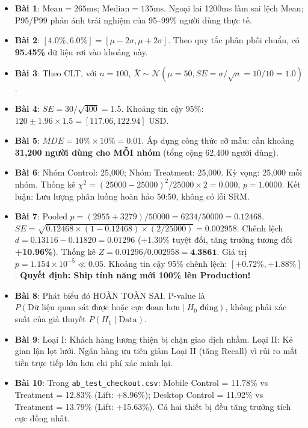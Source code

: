 \begin{dapanbox}
\begin{itemize}
    \item \textbf{Bài 1}: $\text{Mean} = 265$ms; $\text{Median} = 135$ms. Ngoại lai 1200ms làm sai lệch Mean; P95/P99 phản ánh trải nghiệm của 95--99\% người dùng thực tế.
    \item \textbf{Bài 2}: $[4.0\%, 6.0\%] = [\mu - 2\sigma, \mu + 2\sigma]$. Theo quy tắc phân phối chuẩn, có \textbf{95.45\%} dữ liệu rơi vào khoảng này.
    \item \textbf{Bài 3}: Theo CLT, với $n = 100$, $\bar{X} \sim \mathcal{N}(\mu = 50, SE = \sigma/\sqrt{n} = 10/10 = 1.0)$.
    \item \textbf{Bài 4}: $SE = 30 / \sqrt{400} = 1.5$. Khoảng tin cậy 95\%: $120 \pm 1.96 \times 1.5 = [117.06, 122.94]$ USD.
    \item \textbf{Bài 5}: $MDE = 10\% \times 10\% = 0.01$. Áp dụng công thức cỡ mẫu: cần khoảng \textbf{31,200 người dùng cho MỖI nhóm} (tổng cộng 62,400 người dùng).
    \item \textbf{Bài 6}: Nhóm Control: 25,000; Nhóm Treatment: 25,000. Kỳ vọng: 25,000 mỗi nhóm. Thống kê $\chi^2 = (25000-25000)^2/25000 \times 2 = 0.000$, $p = 1.0000$. Kết luận: Lưu lượng phân luồng hoàn hảo 50:50, không có lỗi SRM.
    \item \textbf{Bài 7}: Pooled $p = (2955 + 3279) / 50000 = 6234 / 50000 = 0.12468$. $SE = \sqrt{0.12468 \times (1 - 0.12468) \times (2 / 25000)} = 0.002958$. Chênh lệch $d = 0.13116 - 0.11820 = 0.01296$ (+1.30\% tuyệt đối, tăng trưởng tương đối \textbf{+10.96\%}). Thống kê $Z = 0.01296 / 0.002958 = \textbf{4.3861}$. Giá trị $p = 1.154 \times 10^{-5} \ll 0.05$. Khoảng tin cậy 95\% chênh lệch: $[+0.72\%, +1.88\%]$. \textbf{Quyết định: Ship tính năng mới 100\% lên Production!}
    \item \textbf{Bài 8}: Phát biểu đó HOÀN TOÀN SAI. P-value là $P(\text{Dữ liệu quan sát được hoặc cực đoan hơn} \mid H_0 \text{ đúng})$, không phải xác suất của giả thuyết $P(H_1 \mid \text{Data})$.
    \item \textbf{Bài 9}: Loại I: Khách hàng lương thiện bị chặn giao dịch nhầm. Loại II: Kẻ gian lận lọt lưới. Ngân hàng ưu tiên giảm Loại II (tăng Recall) vì rủi ro mất tiền trực tiếp lớn hơn chi phí xác minh lại.
    \item \textbf{Bài 10}: Trong \texttt{ab\_test\_checkout.csv}: Mobile Control = 11.78\% vs Treatment = 12.83\% (Lift: +8.96\%); Desktop Control = 11.92\% vs Treatment = 13.79\% (Lift: +15.63\%). Cả hai thiết bị đều tăng trưởng tích cực đồng nhất.

\end{itemize}
\end{dapanbox}
